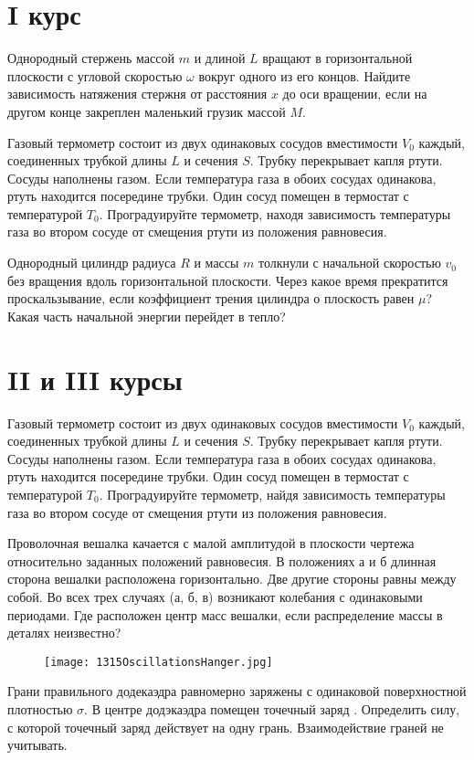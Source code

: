 \section{I курс}

\AddProb Однородный стержень массой $m$ и длиной $L$ вращают в горизонтальной плоскости с угловой скоростью $\omega$ вокруг одного из его концов. 
Найдите зависимость натяжения стержня от расстояния $x$ до оси вращении, если на другом конце закреплен маленький грузик массой $M$.

\AddProb Газовый термометр состоит из двух одинаковых сосудов  вместимости $V_0$ каждый, соединенных трубкой длины $L$ и сечения $S$. 
Трубку перекрывает капля ртути. Сосуды наполнены газом. Если температура газа в обоих сосудах одинакова, ртуть находится посередине трубки. 
Один сосуд помещен в термостат с температурой $T_0$. Проградуируйте термометр, находя зависимость температуры газа во втором сосуде 
от смещения ртути из положения равновесия.

\AddProb Однородный цилиндр радиуса $R$ и массы $m$ толкнули с начальной скоростью $v_0$ без вращения вдоль горизонтальной плоскости. 
Через какое время прекратится проскальзывание, если коэффициент трения цилиндра о плоскость равен $\mu$? Какая часть начальной энергии перейдет в тепло?


\section{II и III курсы}

\AddProb Газовый термометр состоит из двух одинаковых сосудов  вместимости $V_0$ каждый, соединенных трубкой длины $L$ и сечения $S$. 
Трубку перекрывает капля ртути. Сосуды наполнены газом. Если температура газа в обоих сосудах одинакова, ртуть находится посередине трубки. 
Один сосуд помещен в термостат с температурой $T_0$. Проградуируйте термометр, найдя зависимость температуры газа во втором сосуде 
от смещения ртути из положения равновесия.

\AddProb Проволочная вешалка качается с малой амплитудой в плоскости чертежа относительно заданных положений равновесия. 
В положениях а и б длинная сторона вешалки расположена горизонтально. Две другие стороны равны между собой. 
Во всех трех случаях (а, б, в) возникают колебания с одинаковыми периодами. Где расположен центр масс вешалки, если распределение массы в деталях неизвестно?

\begin{figure}[!h]
\texttt{[image: 1315OscillationsHanger.jpg]}
\end{figure}

\AddProb Грани правильного додекаэдра равномерно заряжены с одинаковой поверхностной плотностью $\sigma$. 
В центре додэкаэдра помещен точечный заряд $ $. Определить силу, с которой точечный заряд действует на одну грань. Взаимодействие граней не учитывать. 